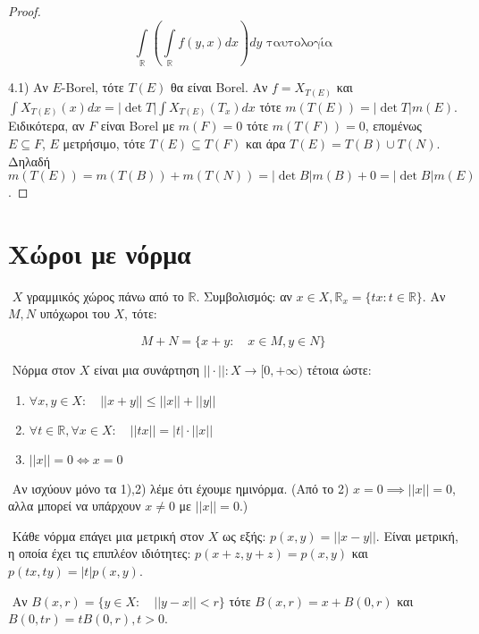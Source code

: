 \begin{proof}
    $$\int\limits_{\mathbb{R}} \left( \int\limits_{\mathbb{R}} f(y,x) dx\right) dy \text{ ταυτολογία}$$


    4.1) Αν $E$-{\eng Borel}, τότε $T(E)$ θα είναι {\eng Borel}. Αν $f = X_{T(E)}$ και $\int X_{T(E)} (x) dx = |\det T| \int X_{T(E)} (T_x) dx$ τότε $m(T(E)) = |\det T| m(E)$. Ειδικότερα, αν $F$ είναι {\eng Borel} με $m(F) = 0$ τότε $m(T(F)) = 0$, επομένως $E \subseteq F$, $E$ μετρήσιμο, τότε $T(E) \subseteq T(F)$ και άρα $T(E) = T(B) \cup T(N)$. Δηλαδή $m(T(E)) = m(T(B)) + m(T(N)) = |\det B| m(B) + 0 = |\det B| m(E)$.
    
\end{proof}


\pagebreak
\section{ Χώροι με νόρμα}

$ $\newline
$X$ γραμμικός χώρος πάνω από το $\mathbb R$. Συμβολισμός: αν $x \in X, \mathbb R_x = \{ tx: t\in \mathbb{R}\}$. Αν $M,N$ υπόχωροι του $X$, τότε:

$$M+N = \{x+y: \quad x\in M, y \in N\}$$

$ $\newline
Νόρμα στον $X$ είναι μια συνάρτηση $||\cdot || : X \rightarrow [0,+\infty)$ τέτοια ώστε:

\begin{enumerate}
    \item $\forall x,y \in X: \quad ||x+y|| \leq ||x|| + ||y||$
    \item $\forall t \in\mathbb R, \forall x \in X: \quad ||tx|| = |t| \cdot ||x||$
    \item $||x|| = 0 \iff x=0$
\end{enumerate}

$ $\newline
Αν ισχύουν μόνο τα 1),2) λέμε ότι έχουμε ημινόρμα. (Από το 2) $x=0 \implies ||x||=0$, αλλα μπορεί να υπάρχουν $x\neq 0$ με $||x|| = 0$.)

$ $\newline
Κάθε νόρμα επάγει μια μετρική στον $X$ ως εξής: $p(x,y) = ||x-y||$. Είναι μετρική, η οποία έχει τις επιπλέον ιδιότητες: $p(x+z,y+z) = p(x,y)$ και $p(tx,ty) = |t| p(x,y)$.

$ $\newline
Αν $B(x,r) = \{y \in X: \quad ||y-x|| < r\}$ τότε $B(x,r) = x + B(0,r)$ και $B(0,tr) = tB(0,r), t>0$.


